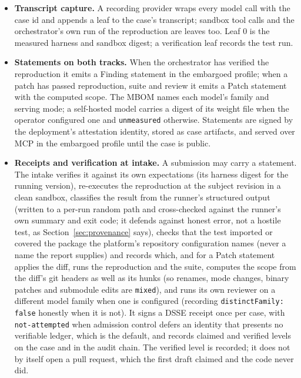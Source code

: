 \documentclass[11pt]{article}
\begin{document}
\begin{itemize}
  \item \textbf{Transcript capture.} A recording provider wraps every model call with the case id and appends a leaf to the case's transcript; sandbox tool calls and the orchestrator's own run of the reproduction are leaves too. Leaf 0 is the measured harness and sandbox digest; a verification leaf records the test run.
  \item \textbf{Statements on both tracks.} When the orchestrator has verified the reproduction it emits a Finding statement in the embargoed profile; when a patch has passed reproduction, suite and review it emits a Patch statement with the computed scope. The MBOM names each model's family and serving mode; a self-hosted model carries a digest of its weight file when the operator configured one and \texttt{unmeasured} otherwise. Statements are signed by the deployment's attestation identity, stored as case artifacts, and served over MCP in the embargoed profile until the case is public.
  \item \textbf{Receipts and verification at intake.} A submission may carry a statement. The intake verifies it against its own expectations (its harness digest for the running version), re-executes the reproduction at the subject revision in a clean sandbox, classifies the result from the runner's structured output (written to a per-run random path and cross-checked against the runner's own summary and exit code; it defends against honest error, not a hostile test, as Section~\ref{sec:provenance} says), checks that the test imported or covered the package the platform's repository configuration names (never a name the report supplies) and records which, and for a Patch statement applies the diff, runs the reproduction and the suite, computes the scope from the diff's git headers as well as its hunks (so renames, mode changes, binary patches and submodule edits are \texttt{mixed}), and runs its own reviewer on a different model family when one is configured (recording \texttt{distinctFamily: false} honestly when it is not). It signs a DSSE receipt once per case, with \texttt{not-attempted} when admission control defers an identity that presents no verifiable ledger, which is the default, and records claimed and verified levels on the case and in the audit chain. The verified level is recorded; it does not by itself open a pull request, which the first draft claimed and the code never did.

\end{itemize}
\end{document}
